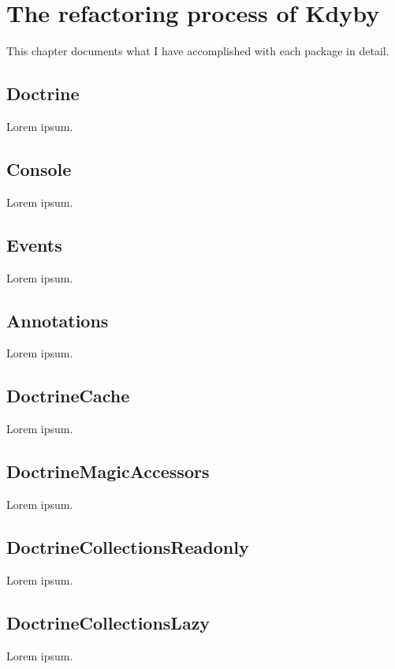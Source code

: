 \chapter{The refactoring process of Kdyby}

This chapter documents what I have accomplished with each package in detail.

\section{Doctrine}

Lorem ipsum.

\section{Console}

Lorem ipsum.

\section{Events}

Lorem ipsum.

\section{Annotations}

Lorem ipsum.

\section{DoctrineCache}

Lorem ipsum.

\section{DoctrineMagicAccessors}

Lorem ipsum.

\section{DoctrineCollectionsReadonly}

Lorem ipsum.

\section{DoctrineCollectionsLazy}

Lorem ipsum.

